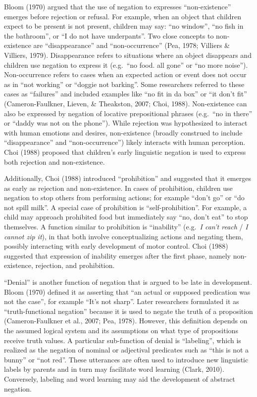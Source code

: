 \documentclass[10pt, letterpaper]{article}
\begin{document}
Bloom (1970) argued that the use of negation to expresses
``non-existence'' emerges before rejection or refusal. For example, when
an object that children expect to be present is not present, children
may say: ``no window'', ``no fish in the bathroom'', or ``I do not have
underpants''. Two close concepts to non-existence are ``disappearance''
and ``non-occurrence'' (Pea, 1978; Villiers \& Villiers, 1979).
Disappearance refers to situations where an object disappears and
children use negation to express it (e.g.~``no food. all gone'' or ``no
more noise''). Non-occurrence refers to cases when an expected action or
event does not occur as in ``not working'' or ``doggie not barking''.
Some researchers referred to these cases as ``failures'' and included
examples like ``no fit in da box'' or ``it don't fit''
(Cameron-Faulkner, Lieven, \& Theakston, 2007; Choi, 1988).
Non-existence can also be expressed by negation of locative
prepositional phrases (e.g.~``no in there'' or ``daddy was not on the
phone''). While rejection was hypothesized to interact with human
emotions and desires, non-existence (broadly construed to include
``disappearance'' and ``non-occurrence'') likely interacts with human
perception. Choi (1988) proposed that children's early linguistic
negation is used to express both rejection and non-existence.

Additionally, Choi (1988) introduced ``prohibition'' and suggested that
it emerges as early as rejection and non-existence. In cases of
prohibition, children use negation to stop others from performing
actions; for example ``don't go'' or ``do not spill milk''. A special
case of prohibition is ``self-prohibition''. For example, a child may
approach prohibited food but immediately say ``no, don't eat'' to stop
themselves. A function similar to prohibition is ``inability''
(e.g.~\emph{I can't reach} / \emph{I cannot zip it}), in that both
involve conceptualizing actions and negating them, possibly interacting
with early development of motor control. Choi (1988) suggested that
expression of inability emerges after the first phase, namely
non-existence, rejection, and prohibition.

``Denial'' is another function of negation that is argued to be late in
development. Bloom (1970) defined it as asserting that ``an actual or
supposed predication was not the case'', for example ``It's not sharp''.
Later researchers formulated it as ``truth-functional negation'' because
it is used to negate the truth of a proposition (Cameron-Faulkner et
al., 2007; Pea, 1978). However, this definition depends on the assumed
logical system and its assumptions on what type of propositions receive
truth values. A particular sub-function of denial is ``labeling'', which
is realized as the negation of nominal or adjectival predicates such as
``this is not a bunny'' or ``not red''. These utterances are often used
to introduce new linguistic labels by parents and in turn may facilitate
word learning (Clark, 2010). Conversely, labeling and word learning may
aid the development of abstract negation.
\end{document}
